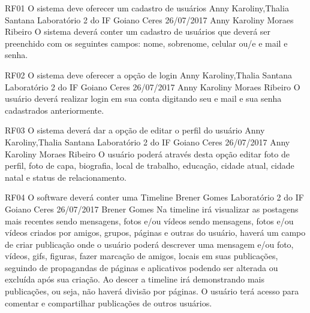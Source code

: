  \requisitoFuncional
 {RF01}
 {O sistema deve oferecer um cadastro de usuários}
 {Anny Karoliny,Thalia Santana}
 {Laboratório 2 do IF Goiano Ceres}
 {26/07/2017}
 {Anny Karoliny Moraes Ribeiro}
 {O sistema deverá conter um cadastro de usuários que deverá ser preenchido com os seguintes campos: nome, sobrenome, celular ou/e e mail e senha.
 }
 
 \requisitoFuncional
 {RF02}
 {O sistema deve oferecer a opção de login}
 {Anny Karoliny,Thalia Santana}
 {Laboratório 2 do IF Goiano Ceres}
 {26/07/2017}
 {Anny Karoliny Moraes Ribeiro}
 {O usuário deverá realizar login em sua conta digitando seu e mail e sua senha cadastrados anteriormente.
 }
 
 \requisitoFuncional
 {RF03}
 {O sistema deverá dar a opção de editar o perfil do usuário}
 {Anny Karoliny,Thalia Santana}
 {Laboratório 2 do IF Goiano Ceres}
 {26/07/2017}
 {Anny Karoliny Moraes Ribeiro}
 {O usuário poderá através desta opção editar  foto de perfil, foto de capa, biografia, local de trabalho, educação, cidade atual, cidade natal e status de relacionamento.
 }
 
 \requisitoFuncional
 {RF04}
 {O software deverá conter uma Timeline}
 {Brener Gomes}
 {Laboratório 2 do IF Goiano Ceres}
 {26/07/2017}
 {Brener Gomes}
 {Na timeline irá visualizar as postagens mais recentes sendo mensagens, fotos e/ou vídeos sendo mensagens, fotos e/ou vídeos criados por amigos, grupos, páginas e outras do usuário, haverá um campo de criar publicação onde o usuário poderá descrever uma mensagem e/ou foto, vídeos, gifs, figuras, fazer marcação de amigos, locais em suas publicações, seguindo de propagandas de páginas e aplicativos podendo ser alterada ou excluída após sua criação. Ao descer a timeline irá demonstrando mais publicações, ou seja, não haverá divisão por páginas. O usuário terá acesso para comentar e compartilhar publicações de outros usuários.
 }
 
